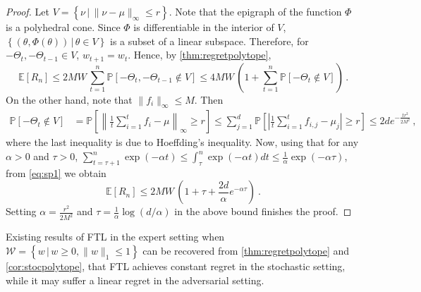 \documentclass[english]{article}
\newcommand{\cW}{\mathcal{W}}
\newcommand{\Exp}[1]{\mathbb{E}\left[ #1 \right]}
\newcommand{\set}[2]{\left\{#1 \,\vert\, #2 \right\}}
\newcommand{\norm}[1]{\left\| #1 \right\|}
\newcommand\numberthis{\addtocounter{equation}{1}\tag{\theequation}}
\newcommand{\Prob}[1]{\mathbb{P}\left[#1\right]}
\begin{document}
\begin{proof}
	Let $V = \set{\nu}{\|\nu - \mu\|_\infty\le r}$. 
	Note that the epigraph of the function $\Phi$ is a polyhedral cone.
	Since $\Phi$ is differentiable in the interior of $V$, $\set{(\theta, \Phi(\theta))}{\theta\in V}$ is a subset of a linear subspace.
	Therefore, for $-\Theta_t, -\Theta_{t-1} \in V$, $w_{t+1}=w_t$.
	Hence, by \cref{thm:regretpolytope},
	\begin{equation}
	\label{eq:sp1}
	\Exp{R_n} \le 2MW\,\sum_{t=1}^{n} \Prob{-\Theta_t,-\Theta_{t-1} \notin V}
	 \le 4MW\,\left(1+\sum_{t=1}^{n} \Prob{-\Theta_t \notin V}\right)\,.
	\end{equation}
	On the other hand, note that $\|f_i\|_\infty\le M$.
	Then 
	\begin{align*}
	\Prob{-\Theta_t \notin V}
	    & = \Prob{ \norm{\frac{1}{t} \sum_{i=1}^{t} f_i - \mu}_\infty \ge r}
		 \le \sum_{j=1}^{d} \Prob{ \left|\frac{1}{t} \sum_{i=1}^{t} f_{i,j} - \mu_j\right| \ge r }
		 \le 2d e^{-\frac{tr^2}{2M^2}}\,,
	\end{align*}
	where the last inequality
	is due to Hoeffding's inequality.
	Now, using that for any $\alpha>0$ and  $\tau > 0$, $\sum_{t=\tau+1}^n \exp(-\alpha t ) \le \int_\tau^n \exp(-\alpha t ) dt 
	\le \frac{1}{\alpha}\exp(-\alpha\tau)$, from \eqref{eq:sp1} we obtain
\[
	\Exp{R_n} \le 2MW \, \left(1+\tau + \frac{2d}{\alpha}e^{-\alpha\tau} \right)~.
\]
Setting $\alpha = \frac{r^2}{2M^2}$ and $\tau = \frac{1}{\alpha}\log(d/\alpha)$ in the above bound finishes the proof.
\end{proof}
\begin{comm}
	Existing results of FTL in the expert setting  when $\cW = \set{w}{w\ge 0, \|w\|_1\le 1}$ can be recovered from \cref{thm:regretpolytope} and \cref{cor:stocpolytope}, that FTL achieves constant regret in the stochastic setting, while it may suffer a linear regret in the adversarial setting.
\end{comm}
\fi
\end{document}
